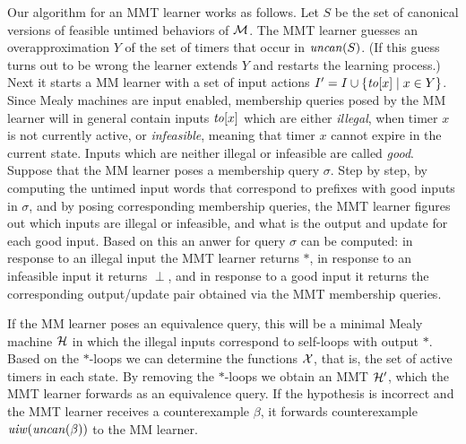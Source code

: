 Our algorithm for an MMT learner works as follows.
Let $S$ be the set of canonical versions of feasible untimed behaviors of ${\mathcal M}$.
The MMT learner guesses an overapproximation $Y$ of the set of timers that occur in $\mathit{uncan}({S})$.
(If this guess turns out to be wrong the learner extends $Y$ and restarts the learning process.)
Next it starts a MM learner with a set of input actions $I' = I \cup \{ \mathit{to}[x] \mid x \in Y \}$.
Since Mealy machines are input enabled, membership queries posed by the MM learner will in general contain
inputs $\mathit{to}[x]$ which are either \emph{illegal}, when timer $x$ is not currently active, or \emph{infeasible},
meaning that timer $x$ cannot expire in the current state.
Inputs which are neither illegal or infeasible are called \emph{good}.
Suppose that the MM learner poses a membership query $\sigma$.
Step by step, by computing the untimed input words that correspond to prefixes with good inputs in $\sigma$, 
and by posing corresponding membership queries,
the MMT learner figures out which inputs are illegal or infeasible, and what is the output and update for each good input.
Based on this an anwer for query $\sigma$ can be computed:
in response to an illegal input the MMT learner returns $\ast$, 
in response to an infeasible input it returns $\perp$,
and in response to a good input it returns the corresponding output/update pair obtained via the MMT membership queries.

If the MM learner poses an equivalence query, this will be a minimal Mealy machine ${\mathcal H}$ in which the illegal
inputs correspond to self-loops with output $\ast$. Based on the $\ast$-loops we can
determine the functions $\mathcal{X}$, that is, the set of active timers in each state. By removing the $\ast$-loops we
obtain an MMT ${\mathcal H}'$, which the MMT learner forwards as an equivalence query.
If the hypothesis is incorrect and the MMT learner receives a counterexample $\beta$,
it forwards counterexample $\mathit{uiw}(\mathit{uncan}({\beta}))$ to the MM learner.

